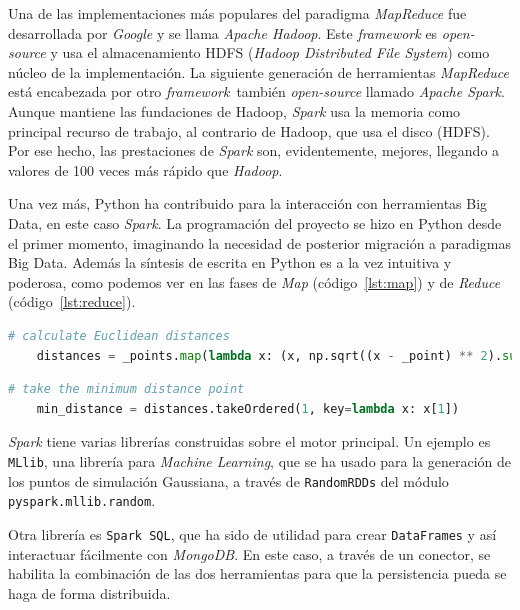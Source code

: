 \documentclass[11pt,spanish,listoffigures,listoftables]{tfgetsinf}
\begin{document}
        Una de las implementaciones más populares del paradigma {\em MapReduce} fue desarrollada por {\em Google} y se llama {\em Apache Hadoop}. Este {\em framework} es {\em open-source} y usa el almacenamiento HDFS ({\em Hadoop Distributed File System}) como núcleo de la implementación. La siguiente generación de herramientas {\em MapReduce} está encabezada por otro {\em framework} también {\em open-source} llamado {\em Apache Spark}. Aunque mantiene las fundaciones de Hadoop, {\em Spark} usa la memoria como principal recurso de trabajo, al contrario de Hadoop, que usa el disco (HDFS). Por ese hecho, las prestaciones de {\em Spark} son, evidentemente, mejores, llegando a valores de 100 veces más rápido que {\em Hadoop}.
        
        Una vez más, Python ha contribuido para la interacción con herramientas Big Data, en este caso {\em Spark}. La programación del proyecto se hizo en Python desde el primer momento, imaginando la necesidad de posterior migración a paradigmas Big Data. Además la síntesis de escrita en Python es a la vez intuitiva y poderosa, como podemos ver en las fases de {\em Map} (código~\ref{lst:map}) y de {\em Reduce} (código~\ref{lst:reduce}).
        
        \begin{lstlisting}[language=Python, caption=Map en Python., label={lst:map}]
    # calculate Euclidean distances
    distances = _points.map(lambda x: (x, np.sqrt((x - _point) ** 2).sum()))
	\end{lstlisting}
	        
        \begin{lstlisting}[language=Python, caption=Reduce en Python., label={lst:reduce}]
    # take the minimum distance point
    min_distance = distances.takeOrdered(1, key=lambda x: x[1])
	\end{lstlisting}
	
	{\em Spark} tiene varias librerías construidas sobre el motor principal. Un ejemplo es {\tt MLlib}, una librería para {\em Machine Learning}, que se ha usado para la generación de los puntos de simulación Gaussiana, a través de {\tt RandomRDDs} del módulo {\tt pyspark.mllib.random}. 
	
	Otra librería es {\tt Spark SQL}, que ha sido de utilidad para crear {\tt DataFrames} y así interactuar fácilmente con {\em MongoDB}. En este caso, a través de un conector, se habilita la combinación de las dos herramientas para que la persistencia pueda se haga de forma distribuida.
        
\end{document}
